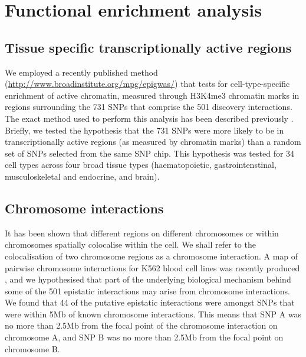 \documentclass{article}
\begin{document}
\section{Functional enrichment analysis}

\subsection{Tissue specific transcriptionally active regions}

We employed a recently published method (\url{http://www.broadinstitute.org/mpg/epigwas/}) \cite{Trynka2013} that tests for cell-type-specific enrichment of active chromatin, measured through H3K4me3 chromatin marks \cite{Koch2007} in regions surrounding the 731 SNPs that comprise the 501 discovery interactions. The exact method used to perform this analysis has been described previously \cite{Rietveld2013}. Briefly, we tested the hypothesis that the 731 SNPs were more likely to be in transcriptionally active regions (as measured by chromatin marks) than a random set of SNPs selected from the same SNP chip. This hypothesis was tested for 34 cell types across four broad tissue types (haematopoietic, gastrointenstinal, musculoskeletal and endocrine, and brain).


\subsection{Chromosome interactions}

It has been shown \cite{Lieberman-Aiden2009} that different regions on different chromosomes or within chromosomes spatially colocalise within the cell. We shall refer to the colocalisation of two chromosome regions as a chromosome interaction. A map of pairwise chromosome interactions for K562 blood cell lines was recently produced \cite{Lan2012}, and we hypothesised that part of the underlying biological mechanism behind some of the 501 epistatic interactions may arise from chromosome interactions. We found that 44 of the putative epistatic interactions were amongst SNPs that were within 5Mb of known chromosome interactions. This means that SNP A was no more than 2.5Mb from the focal point of the chromosome interaction on chromosome A, and SNP B was no more than 2.5Mb from the focal point on chromosome B.
\end{document}
